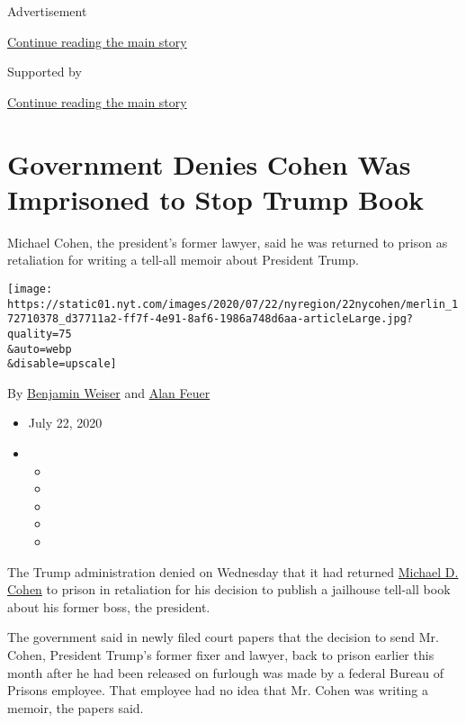 Advertisement

\protect\hyperlink{after-top}{Continue reading the main story}

Supported by

\protect\hyperlink{after-sponsor}{Continue reading the main story}

\hypertarget{government-denies-cohen-was-imprisoned-to-stop-trump-book}{%
\section{Government Denies Cohen Was Imprisoned to Stop Trump
Book}\label{government-denies-cohen-was-imprisoned-to-stop-trump-book}}

Michael Cohen, the president's former lawyer, said he was returned to
prison as retaliation for writing a tell-all memoir about President
Trump.

\texttt{[image: https://static01.nyt.com/images/2020/07/22/nyregion/22nycohen/merlin\_172710378\_d37711a2-ff7f-4e91-8af6-1986a748d6aa-articleLarge.jpg?quality=75\\\&auto=webp\\\&disable=upscale]}

By \href{https://www.nytimes.com/by/benjamin-weiser}{Benjamin Weiser}
and \href{https://www.nytimes.com/by/alan-feuer}{Alan Feuer}

\begin{itemize}
\item
  July 22, 2020
\item
  \begin{itemize}
  \item
  \item
  \item
  \item
  \item
  \end{itemize}
\end{itemize}

The Trump administration denied on Wednesday that it had returned
\href{https://www.nytimes.com/2020/07/23/nyregion/michael-cohen-trump-book.html}{Michael
D. Cohen} to prison in retaliation for his decision to publish a
jailhouse tell-all book about his former boss, the president.

The government said in newly filed court papers that the decision to
send Mr. Cohen, President Trump's former fixer and lawyer, back to
prison earlier this month after he had been released on furlough was
made by a federal Bureau of Prisons employee. That employee had no idea
that Mr. Cohen was writing a memoir, the papers said.

